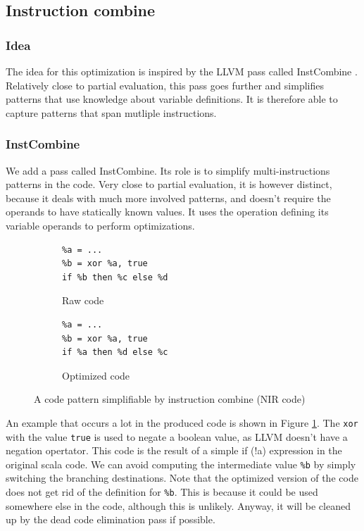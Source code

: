\documentclass[11pt,a4paper]{article}
\newcommand{\scala}[1]{\textsf{#1}}
\newcommand{\nir}[1]{\texttt{#1}}
\begin{document}
\subsection{Instruction combine}

\subsubsection*{Idea}

The idea for this optimization is inspired by the LLVM pass called \scala{InstCombine} \cite{llvm}. Relatively close to partial evaluation, this pass goes further and simplifies patterns that use knowledge about variable definitions. It is therefore able to capture patterns that span mutliple instructions.

\subsubsection*{InstCombine}

We add a pass called \scala{InstCombine}. Its role is to simplify multi-instructions patterns in the code. Very close to partial evaluation, it is however distinct, because it deals with much more involved patterns, and doesn't require the operands to have statically known values. It uses the operation defining its variable operands to perform optimizations.

\begin{figure}[h]
	\begin{subfigure}{0.5\textwidth}
		\begin{lstlisting}
%a = ...
%b = xor %a, true
if %b then %c else %d
		\end{lstlisting}
		\caption{Raw code}
	\end{subfigure}
	\quad
	\begin{subfigure}{0.5\textwidth}
		\begin{lstlisting}
%a = ...
%b = xor %a, true
if %a then %d else %c
		\end{lstlisting}
		\caption{Optimized code}
	\end{subfigure}
	\caption{A code pattern simplifiable by instruction combine (NIR code)}
	\label{fig:ic}
\end{figure}

An example that occurs a lot in the produced code is shown in Figure \ref{fig:ic}. The \nir{xor} with the value \nir{true} is used to negate a boolean value, as LLVM doesn't have a negation opertator. This code is the result of a simple \scala{if (!a)} expression in the original scala code. We can avoid computing the intermediate value \nir{\%b} by simply switching the branching destinations. Note that the optimized version of the code does not get rid of the definition for \nir{\%b}. This is because it could be used somewhere else in the code, although this is unlikely. Anyway, it will be cleaned up by the dead code elimination pass if possible.
\end{document}
